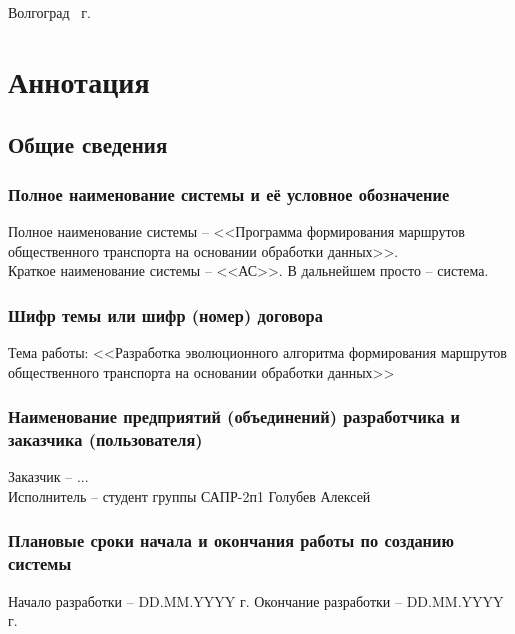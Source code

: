 \vspace{\fill}
\begin{center}
    Волгоград \the\year\ г.
\end{center}
\newpage

\stopcontents

\tocless\part{Аннотация}
\newpage

\startcontents[sections]
\setcounter{chapter}{0}

\chapter{Общие сведения}
\section{Полное наименование системы и её условное обозначение}
Полное наименование системы -- <<Программа формирования маршрутов 
общественного транспорта на основании обработки данных>>.\\
Краткое наименование системы -- <<АС>>. В дальнейшем просто -- система.

\section{Шифр темы или шифр (номер) договора}
Тема работы: <<Разработка эволюционного алгоритма формирования маршрутов 
общественного транспорта на основании обработки данных>>\\

\section{Наименование предприятий (объединений) разработчика и заказчика (пользователя)}
Заказчик -- ...\\
Исполнитель -- студент группы САПР-2п1 Голубев Алексей

\section{Плановые сроки начала и окончания работы по созданию системы}
Начало разработки -- DD.MM.YYYY г. Окончание разработки -- DD.MM.YYYY г.

